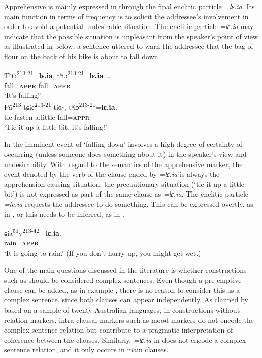 \documentclass[output=paper,colorlinks,citecolor=brown, language=chinese]{langscibook}
\begin{document}
Apprehensive is mainly expressed in  through the final enclitic particle \textit{=lɛ.ia}. Its main function in terms of frequency is to solicit the addressee's involvement in order to avoid a potential undesirable situation. The enclitic particle \textit{=lɛ.ia} may indicate that the possible situation is unpleasant from the speaker's point of view as illustrated in  below, a sentence uttered to warn the addressee that the bag of flour on the back of his bike is about to fall down.


\ea \label{ex:Song13}
\ea \label{ex:Song13a}
\gll Tʰiɔ\textsuperscript{213-21}=\textbf{lɛ.ia}, tʰiɔ\textsuperscript{213-21}=\textbf{lɛ.ia} \ldots \\
fall=\textsc{\textbf{appr}} fall=\textsc{\textbf{appr}} \\
\glt `It's falling!' \\
\ex \label{ex:Song13b}
\gll Pã\textsuperscript{213} tɕiɛ̃\textsuperscript{213-21} tiɑ˞, tʰiɔ\textsuperscript{213-21}=\textbf{lɛ.ia.} \\
tie fasten a.little fall=\textsc{\textbf{appr}} \\
\glt `Tie it up a little bit, it's falling!'
\z
\z


\noindent In  the imminent event of `falling down' involves a high degree of certainty of occurring (unless someone does something about it) in the speaker's view and undesirability. With regard to the semantics of the apprehensive marker, the event denoted by the verb of the clause ended by \textit{=lɛ.ia} is always the apprehension-causing situation; the precautionary situation (`tie it up a little bit') is not expressed as part of the same clause as \textit{=lɛ.ia}. The enclitic particle \textit{=le.ia} requests the addressee to do something. This can be expressed overtly, as in , or this needs to be inferred, as in .

\ea\label{ex:Song14}
\gll ɕia\textsuperscript{51}y\textsuperscript{213-42}\textbf{=lɛ.ia}. \\
rain=\textsc{\textbf{appr}}\\
\glt `It is going to rain.' (If you don't hurry up, you might get wet.)
\z


One of the main questions discussed in the literature is whether constructions such as  should be considered complex sentences. Even though a pre-emptive clause can be added, as in example , there is no reason to consider this as a complex sentence, since both clauses can appear independently. As claimed by \citet[222]{verstraete2006b} based on a sample of twenty Australian languages, in constructions without relation markers, intra-clausal markers such as mood markers do not encode the complex sentence relation but contribute to a pragmatic interpretation of coherence between the clauses. Similarly, \textit{=lɛ.ia} in  does not encode a complex sentence relation, and it only occurs in main clauses.
\end{document}
